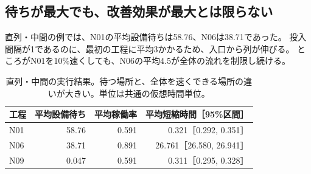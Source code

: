 \documentclass[a4paper,11pt]{ltjsarticle}
\begin{document}
\subsection{待ちが最大でも、改善効果が最大とは限らない}
直列・中間の例では、N01の平均設備待ちは58.76、N06は38.71であった。
投入間隔が1であるのに、最初の工程に平均3かかるため、入口から列が伸びる。
ところがN01を10\%速くしても、N06の平均4.5が全体の流れを制限し続ける。
\begin{table}[htbp]\centering
\begin{tabular}{lrrr}\toprule
工程 & 平均設備待ち & 平均稼働率 & 平均短縮時間［95\%区間］\\\midrule
N01 & 58.76 & 0.591 & 0.321［0.292, 0.351］\\
N06 & 38.71 & 0.891 & 26.761［26.580, 26.941］\\
N09 & 0.047 & 0.591 & 0.311［0.295, 0.328］\\\bottomrule
\end{tabular}
\caption{直列・中間の実行結果。待つ場所と、全体を速くできる場所の違いが大きい。単位は共通の仮想時間単位。}
\end{table}
\end{document}
